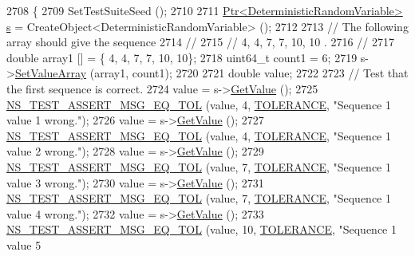 \begin{DoxyCode}
2708 \{
2709   SetTestSuiteSeed ();
2710 
2711   \hyperlink{classns3_1_1Ptr}{Ptr<DeterministicRandomVariable>} \hyperlink{generate__test__data__lte__sinr_8m_ad83eeb3a142285d1243a08c6b7026df8}{s} = 
      CreateObject<DeterministicRandomVariable> ();
2712 
2713   \textcolor{comment}{// The following array should give the sequence}
2714   \textcolor{comment}{//}
2715   \textcolor{comment}{//    4, 4, 7, 7, 10, 10 .}
2716   \textcolor{comment}{//}
2717   \textcolor{keywordtype}{double} array1 [] = \{ 4, 4, 7, 7, 10, 10\};
2718   uint64\_t count1 = 6;
2719   s->\hyperlink{classns3_1_1DeterministicRandomVariable_af705c5489a2cb8dd541b1f460c344804}{SetValueArray} (array1, count1);
2720 
2721   \textcolor{keywordtype}{double} value;
2722 
2723   \textcolor{comment}{// Test that the first sequence is correct.}
2724   value = s->\hyperlink{classns3_1_1DeterministicRandomVariable_aad908286981f00bc2f335c34c41b6f55}{GetValue} (); 
2725   \hyperlink{group__testing_ga9e7861b56b4e70db3b56044cb7a28e41}{NS\_TEST\_ASSERT\_MSG\_EQ\_TOL} (value, 4, \hyperlink{classRandomVariableStreamDeterministicTestCase_aa1cf92085bcc0ffa800f46707b1b29d8}{TOLERANCE}, \textcolor{stringliteral}{"Sequence 1 value 1
       wrong."}); 
2726   value = s->\hyperlink{classns3_1_1DeterministicRandomVariable_aad908286981f00bc2f335c34c41b6f55}{GetValue} (); 
2727   \hyperlink{group__testing_ga9e7861b56b4e70db3b56044cb7a28e41}{NS\_TEST\_ASSERT\_MSG\_EQ\_TOL} (value, 4, \hyperlink{classRandomVariableStreamDeterministicTestCase_aa1cf92085bcc0ffa800f46707b1b29d8}{TOLERANCE}, \textcolor{stringliteral}{"Sequence 1 value 2
       wrong."}); 
2728   value = s->\hyperlink{classns3_1_1DeterministicRandomVariable_aad908286981f00bc2f335c34c41b6f55}{GetValue} (); 
2729   \hyperlink{group__testing_ga9e7861b56b4e70db3b56044cb7a28e41}{NS\_TEST\_ASSERT\_MSG\_EQ\_TOL} (value, 7, \hyperlink{classRandomVariableStreamDeterministicTestCase_aa1cf92085bcc0ffa800f46707b1b29d8}{TOLERANCE}, \textcolor{stringliteral}{"Sequence 1 value 3
       wrong."}); 
2730   value = s->\hyperlink{classns3_1_1DeterministicRandomVariable_aad908286981f00bc2f335c34c41b6f55}{GetValue} (); 
2731   \hyperlink{group__testing_ga9e7861b56b4e70db3b56044cb7a28e41}{NS\_TEST\_ASSERT\_MSG\_EQ\_TOL} (value, 7, \hyperlink{classRandomVariableStreamDeterministicTestCase_aa1cf92085bcc0ffa800f46707b1b29d8}{TOLERANCE}, \textcolor{stringliteral}{"Sequence 1 value 4
       wrong."}); 
2732   value = s->\hyperlink{classns3_1_1DeterministicRandomVariable_aad908286981f00bc2f335c34c41b6f55}{GetValue} (); 
2733   \hyperlink{group__testing_ga9e7861b56b4e70db3b56044cb7a28e41}{NS\_TEST\_ASSERT\_MSG\_EQ\_TOL} (value, 10, \hyperlink{classRandomVariableStreamDeterministicTestCase_aa1cf92085bcc0ffa800f46707b1b29d8}{TOLERANCE}, \textcolor{stringliteral}{"Sequence 1 value 5
}
\end{DoxyCode}
